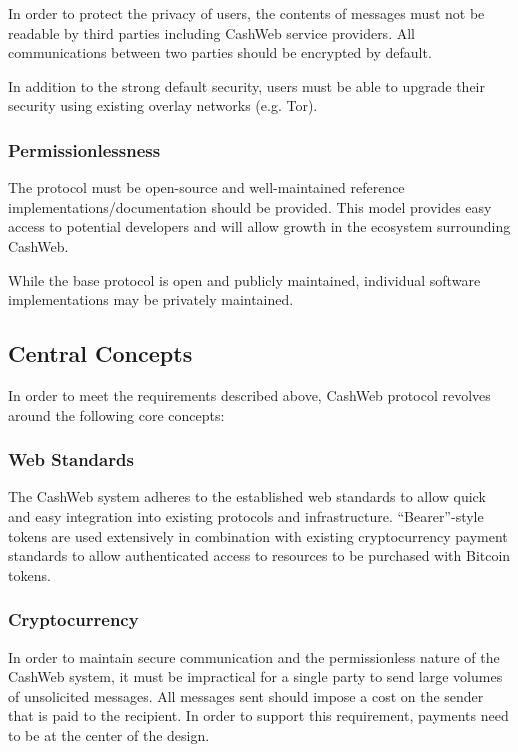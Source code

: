 \documentclass{article}
\begin{document}
In order to protect the privacy of users, the contents of messages must not be readable by third parties including CashWeb service providers. All communications between two parties should be encrypted by default.

In addition to the strong default security, users must be able to upgrade their security using existing overlay networks (e.g. Tor).

\subsubsection{Permissionlessness}

The protocol must be open-source and well-maintained reference implementations/documentation should be provided. This model provides easy access to potential developers and will allow growth in the ecosystem surrounding CashWeb.

While the base protocol is open and publicly maintained, individual software implementations may be privately maintained.

\subsection{Central Concepts} %

In order to meet the requirements described above, CashWeb protocol revolves around the following core concepts:

\subsubsection{Web Standards}

The CashWeb system adheres to the established web standards to allow quick and easy integration into existing protocols and infrastructure. ``Bearer''-style tokens are used extensively in combination with existing cryptocurrency payment standards to allow authenticated access to resources to be purchased with Bitcoin tokens.

\subsubsection{Cryptocurrency}

In order to maintain secure communication and the permissionless nature of the CashWeb system, it must be impractical for a single party to send large volumes of unsolicited messages. All messages sent should impose a cost on the sender that is paid to the recipient. In order to support this requirement, payments need to be at the center of the design.
\end{document}
